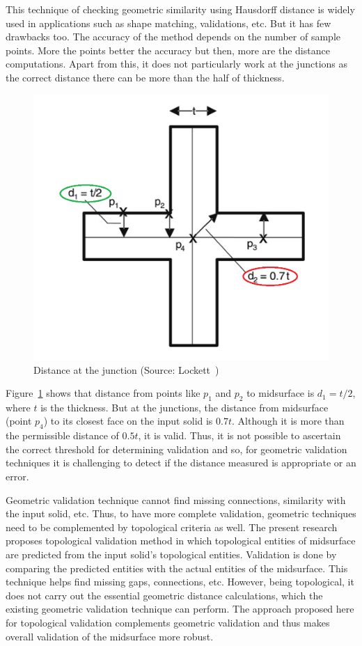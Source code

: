 
This technique of checking geometric similarity using Hausdorff distance is widely used in applications such as shape matching, validations, etc. But it has few drawbacks too. The accuracy of the method depends on the number of sample points. More the points better the accuracy but then, more are the distance computations. Apart from this, it does not particularly work at the junctions as the correct distance there can be more than the half of thickness. 


\begin{figure}[!h]
\centering     %
\includegraphics[width=0.45\linewidth,valign=t]{images/lockettx}
\caption{Distance at the junction (Source: Lockett~\cite{Lockett2008})}
\label{fig:litsurvey:lockettx}
\end{figure}


Figure~\ref{fig:litsurvey:lockettx} shows that distance from points like $p_1$ and $p_2$ to midsurface is $d_1 = t/2$, where $t$ is the thickness. But at the junctions, the distance from midsurface (point $p_4$) to its closest face on the input solid is $0.7t$. Although it is more than the permissible distance of $0.5t$, it is valid. Thus, it is not possible to ascertain the correct threshold for determining validation and so, for geometric validation techniques it is challenging to detect if the distance measured is appropriate or an error.


Geometric validation technique cannot find missing connections, similarity with the input solid, etc. Thus, to have more complete validation, geometric techniques need to be complemented by topological criteria as well. The present research proposes topological validation method in which topological entities of midsurface are predicted from the input solid's topological entities. Validation is done by comparing the predicted entities with the actual entities of the midsurface. This technique helps find missing gaps, connections, etc. However, being topological, it does not carry out the essential geometric distance calculations, which the existing  geometric validation technique can perform. The approach proposed here for topological validation complements geometric validation and thus makes overall validation of the midsurface more robust.

